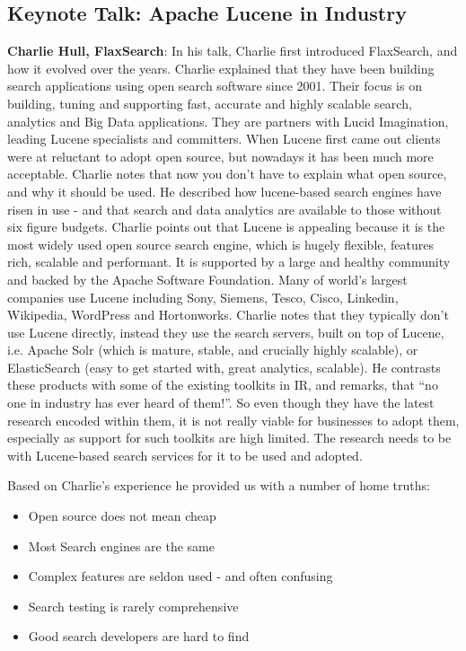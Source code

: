 \subsection*{Keynote Talk: Apache Lucene in Industry} 
{\bf Charlie Hull, FlaxSearch}: In his talk, Charlie first introduced FlaxSearch, and how it evolved over the years. Charlie explained that they have been building search applications using open search software since 2001. Their focus is on building, tuning and supporting fast, accurate and highly scalable search, analytics and Big Data applications. They are partners with Lucid Imagination, leading Lucene specialists and committers. When Lucene first came out clients were at reluctant to adopt open source, but nowadays it has been much more acceptable. Charlie notes that now you don't have to explain what open source, and why it should be used. He described how lucene-based search engines have risen in use - and that search and data analytics are available to those without six figure budgets. Charlie points out that Lucene is appealing because it is the most widely used open source search engine, which is hugely flexible, features rich, scalable and performant. It is supported by a large and healthy community and backed by the Apache Software Foundation. Many of world's largest companies use Lucene including Sony, Siemens, Tesco, Cisco, Linkedin, Wikipedia, WordPress and Hortonworks. Charlie notes that they typically don't use Lucene directly, instead they use the search servers, built on top of Lucene, i.e. Apache Solr (which is mature, stable, and crucially highly scalable), or ElasticSearch (easy to get started with, great analytics, scalable). He contrasts these products with some of the existing toolkits in IR, and remarks, that ``no one in industry has ever heard of them!''. So even though they have the latest research encoded within them, it is not really viable for businesses to adopt them, especially as support for such toolkits are high limited. The research needs to be with Lucene-based search services for it to be used and adopted. 


Based on Charlie's experience he provided us with a number of home truths:
\begin{itemize}
	\item Open source does not mean cheap 
	\item Most Search engines are the same 
	\item Complex features are seldon used - and often confusing
	\item Search testing is rarely comprehensive
	\item Good search developers are hard to find
\end{itemize}


